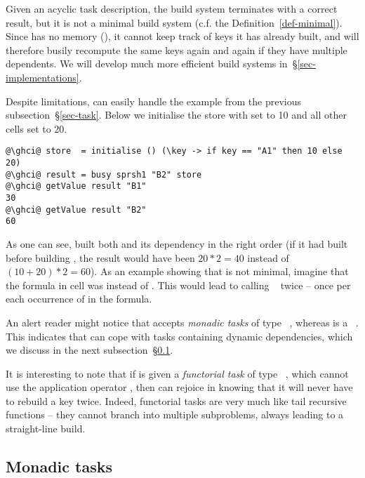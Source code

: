 Given an acyclic task description, the  build system terminates with a
correct result, but it is not a minimal build system (c.f. the
Definition~\ref{def-minimal}). Since  has no memory (), it
cannot keep track of keys it has already built, and will therefore busily
recompute the same keys again and again if they have multiple dependents. We
will develop much more efficient build systems in~\S\ref{sec-implementations}.

Despite limitations,  can easily handle the example 
from the previous subsection~\S\ref{sec-task}. Below we initialise the store with
 set to 10 and all other cells set to 20.

\begin{verbatim}
@\ghci@ store  = initialise () (\key -> if key == "A1" then 10 else 20)
@\ghci@ result = busy sprsh1 "B2" store
@\ghci@ getValue result "B1"
30
@\ghci@ getValue result "B2"
60
\end{verbatim}

\noindent
As one can see,  built both  and its dependency  in the
right order (if it had built  before building , the result would
have been $20 * 2 = 40$ instead of $(10 + 20) * 2 = 60$). As an example showing
that  is not minimal, imagine that the formula in cell  was
 instead of . This would lead to calling
~ twice -- once per each occurrence of  in the
formula.

An alert reader might notice that  accepts \emph{monadic tasks} of
type ~, whereas  is a ~.
This indicates that  can cope with tasks containing dynamic
dependencies, which we discuss in the next subsection~\S\ref{sec-task-monad}.

It is interesting to note that if  is given a \emph{functorial task}
of type ~, which cannot use the application operator
\hs{<*>}, then  can rejoice in knowing that it will never have to
rebuild a key twice. Indeed, functorial tasks are very much like tail recursive
functions -- they cannot branch into multiple subproblems, always leading to a
straight-line build.

\subsection{Monadic tasks}\label{sec-task-monad}

